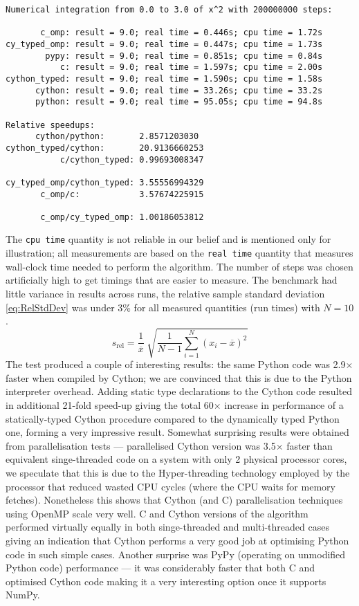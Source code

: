 \begin{Verbatim}[label=typical benchmark run,frame=single]
Numerical integration from 0.0 to 3.0 of x^2 with 200000000 steps:

       c_omp: result = 9.0; real time = 0.446s; cpu time = 1.72s
cy_typed_omp: result = 9.0; real time = 0.447s; cpu time = 1.73s
        pypy: result = 9.0; real time = 0.851s; cpu time = 0.84s
           c: result = 9.0; real time = 1.597s; cpu time = 2.00s
cython_typed: result = 9.0; real time = 1.590s; cpu time = 1.58s
      cython: result = 9.0; real time = 33.26s; cpu time = 33.2s
      python: result = 9.0; real time = 95.05s; cpu time = 94.8s

Relative speedups:
      cython/python:       2.8571203030
cython_typed/cython:       20.9136660253
           c/cython_typed: 0.99693008347

cy_typed_omp/cython_typed: 3.55556994329
       c_omp/c:            3.57674225915

       c_omp/cy_typed_omp: 1.00186053812
\end{Verbatim}
The \verb|cpu time| quantity is not reliable in our belief and is mentioned only for illustration;
all measurements are based on the \verb|real time| quantity that measures wall-clock time needed to
perform the algorithm. The number of steps was chosen artificially high to get timings that are
easier to measure.
The benchmark had little variance in results across runs, the relative sample standard deviation
\eqref{eq:RelStdDev} was under 3\% for all measured quantities (run times) with \(N = 10\).
\begin{equation} \label{eq:RelStdDev}
	s_{\text{rel}} = \frac{1}{\overline{x}} \; \sqrt{\frac{1}{N-1} \sum_{i=1}^N (x_i - \overline{x})^2}
\end{equation}
The test produced a couple of interesting results: the same Python code was 2.9\(\times\) faster
when compiled by Cython; we are convinced that this is due to the Python interpreter overhead. Adding
static type declarations to the Cython code resulted in additional 21-fold speed-up giving the total
60\(\times\) increase in performance of a statically-typed Cython procedure compared to the dynamically
typed Python one, forming a very impressive result. Somewhat surprising results were obtained from
parallelisation tests --- parallelised Cython version was 3.5\(\times\) faster than equivalent
singe-threaded code on a system with only 2 physical processor cores, we speculate that this is due
to the Hyper-threading technology employed by the processor that reduced wasted CPU cycles (where
the CPU waits for memory fetches). Nonetheless this shows that Cython (and C) parallelisation techniques
using OpenMP scale very well. C and Cython versions of the algorithm performed virtually equally
in both singe-threaded and multi-threaded cases giving an indication that Cython performs a very good
job at optimising Python code in such simple cases. Another surprise was PyPy (operating on
unmodified Python code) performance --- it was considerably faster that both C and optimised Cython
code making it a very interesting option once it supports NumPy.


